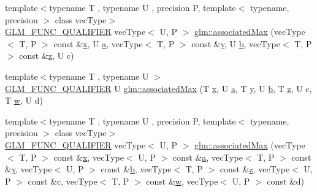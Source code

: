\begin{DoxyCompactItemize}
{\footnotesize template$<$typename T , typename U , precision P, template$<$ typename, precision $>$ class vec\+Type$>$ }\\\mbox{\hyperlink{setup_8hpp_a33fdea6f91c5f834105f7415e2a64407}{G\+L\+M\+\_\+\+F\+U\+N\+C\+\_\+\+Q\+U\+A\+L\+I\+F\+I\+ER}} vec\+Type$<$ U, P $>$ \mbox{\hyperlink{group__gtx__associated__min__max_ga327136e6a568569c03a056f90814b656}{glm\+::associated\+Max}} (vec\+Type$<$ T, P $>$ const \&\mbox{\hyperlink{glad_8h_a92d0386e5c19fb81ea88c9f99644ab1d}{x}}, U \mbox{\hyperlink{glad_8h_ac8729153468b5dcf13f971b21d84d4e5}{a}}, vec\+Type$<$ T, P $>$ const \&\mbox{\hyperlink{glad_8h_a66ddd433d2cacfe27f5906b7e86faeed}{y}}, U \mbox{\hyperlink{glad_8h_a6eba317e3cf44d6d26c04a5a8f197dcb}{b}}, vec\+Type$<$ T, P $>$ const \&\mbox{\hyperlink{glad_8h_acb78bf1972d3eaf07da34ff2e0a2f133}{z}}, U c)
\item 
{\footnotesize template$<$typename T , typename U $>$ }\\\mbox{\hyperlink{setup_8hpp_a33fdea6f91c5f834105f7415e2a64407}{G\+L\+M\+\_\+\+F\+U\+N\+C\+\_\+\+Q\+U\+A\+L\+I\+F\+I\+ER}} U \mbox{\hyperlink{group__gtx__associated__min__max_ga3038ffcb43eaa6af75897a99a5047ccc}{glm\+::associated\+Max}} (T \mbox{\hyperlink{glad_8h_a92d0386e5c19fb81ea88c9f99644ab1d}{x}}, U \mbox{\hyperlink{glad_8h_ac8729153468b5dcf13f971b21d84d4e5}{a}}, T \mbox{\hyperlink{glad_8h_a66ddd433d2cacfe27f5906b7e86faeed}{y}}, U \mbox{\hyperlink{glad_8h_a6eba317e3cf44d6d26c04a5a8f197dcb}{b}}, T \mbox{\hyperlink{glad_8h_acb78bf1972d3eaf07da34ff2e0a2f133}{z}}, U c, T \mbox{\hyperlink{glad_8h_a1d0296e9e835f2e1ee17634af95fc1ec}{w}}, U d)
\item 
{\footnotesize template$<$typename T , typename U , precision P, template$<$ typename, precision $>$ class vec\+Type$>$ }\\\mbox{\hyperlink{setup_8hpp_a33fdea6f91c5f834105f7415e2a64407}{G\+L\+M\+\_\+\+F\+U\+N\+C\+\_\+\+Q\+U\+A\+L\+I\+F\+I\+ER}} vec\+Type$<$ U, P $>$ \mbox{\hyperlink{group__gtx__associated__min__max_gaf607886421c35cd7e4f41a50d7c330e3}{glm\+::associated\+Max}} (vec\+Type$<$ T, P $>$ const \&\mbox{\hyperlink{glad_8h_a92d0386e5c19fb81ea88c9f99644ab1d}{x}}, vec\+Type$<$ U, P $>$ const \&\mbox{\hyperlink{glad_8h_ac8729153468b5dcf13f971b21d84d4e5}{a}}, vec\+Type$<$ T, P $>$ const \&\mbox{\hyperlink{glad_8h_a66ddd433d2cacfe27f5906b7e86faeed}{y}}, vec\+Type$<$ U, P $>$ const \&\mbox{\hyperlink{glad_8h_a6eba317e3cf44d6d26c04a5a8f197dcb}{b}}, vec\+Type$<$ T, P $>$ const \&\mbox{\hyperlink{glad_8h_acb78bf1972d3eaf07da34ff2e0a2f133}{z}}, vec\+Type$<$ U, P $>$ const \&c, vec\+Type$<$ T, P $>$ const \&\mbox{\hyperlink{glad_8h_a1d0296e9e835f2e1ee17634af95fc1ec}{w}}, vec\+Type$<$ U, P $>$ const \&d)

\end{DoxyCompactItemize}
